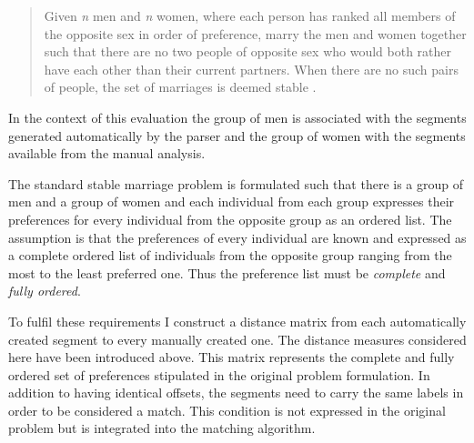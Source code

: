     \begin{quotation}
        Given \textit{n} men and \textit{n} women, where each person has ranked all members of the opposite sex in order of preference, marry the men and women together such that there are no two people of opposite sex who would both rather have each other than their current partners. When there are no such pairs of people, the set of marriages is deemed stable \citet{iwama2008}.
    \end{quotation}

    In the context of this evaluation the group of men is associated with the segments generated automatically by the parser and the group of women with the segments available from the manual analysis. 

    The standard stable marriage problem is formulated such that there is a group of men and a group of women and each individual from each group expresses their preferences for every individual from the opposite group as an ordered list. The assumption is that the preferences of every individual are known and expressed as a complete ordered list of individuals from the opposite group ranging from the most to the least preferred one. Thus the preference list must be \textit{complete} and \textit{fully ordered}. 

    To fulfil these requirements I construct a distance matrix from each automatically created segment to every manually created one. The distance measures considered here have been introduced above. This matrix represents the complete and fully ordered set of preferences stipulated in the original problem formulation. In addition to having identical offsets, the segments need to carry the same labels in order to be considered a match. This condition is not expressed in the original problem but is integrated into  the matching algorithm. 

